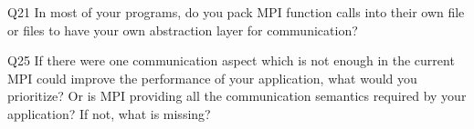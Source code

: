 \begin{description}%
\item{Q21} In most of your programs, do you pack MPI function calls into their own file or files to have your own abstraction layer for communication?%
\item{Q25} If there were one communication aspect which is not enough in the current MPI could improve the performance of your application, what would you prioritize? Or is MPI providing all the communication semantics required by your application? If not, what is missing?%
\end{description}%
